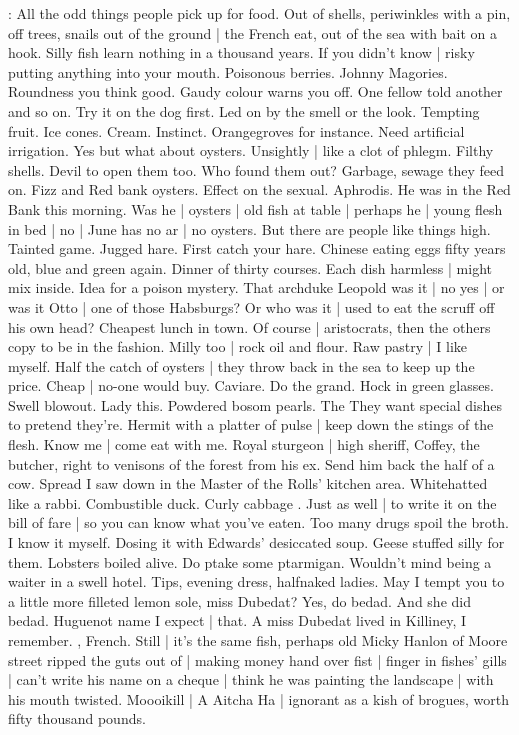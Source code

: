 \BloomInt:
All the odd things people pick up for food.
Out of shells,
periwinkles with a pin,
off trees,
snails out of the ground |
the French eat,
out of the sea with bait on a hook.
Silly fish learn nothing in a thousand years.
If you didn't know |
risky putting anything into your mouth.
Poisonous berries.
Johnny Magories.
Roundness you think good.
Gaudy colour warns you off.
One fellow told another and so on.
Try it on the dog first.
Led on by the smell or the look.
Tempting fruit.
Ice cones.
Cream.
Instinct.
Orangegroves for instance.
Need artificial irrigation.
Yes but what about oysters.
Unsightly |
like a clot of phlegm.
Filthy shells.
Devil to open them too.
Who found them out?
Garbage, sewage they feed on.
Fizz and Red bank oysters.
Effect on the sexual.
Aphrodis.
He was in the Red Bank this morning.
Was he |
oysters |
old fish at table |
perhaps he |
young flesh in bed |
no |
June has no ar |
no oysters.
But there are people like things high.
Tainted game.
Jugged hare.
First catch your hare.
Chinese eating eggs fifty years old,
blue and green again.
Dinner of thirty courses.
Each dish harmless |
might mix inside.
Idea for a poison mystery.
That archduke Leopold was it |
no yes |
or was it Otto |
one of those Habsburgs?
Or who was it |
used to eat the scruff off his own head?
Cheapest lunch in town.
Of course |
aristocrats,
then the others copy to be in the fashion.
Milly too |
rock oil and flour.
Raw pastry |
I like myself.
Half the catch of oysters |
they throw back in the sea to keep up the price.
Cheap |
no-one would buy.
Caviare.
Do the grand.
Hock in green glasses.
Swell blowout.
Lady this.
Powdered bosom pearls.
The 
They want special dishes to pretend they're.
Hermit with a platter of pulse |
keep down the stings of the flesh.
Know me |
come eat with me.
Royal sturgeon |
high sheriff,
Coffey, the butcher,
right to venisons of the forest from his ex.
Send him back the half of a cow.
Spread I saw down in the Master of the Rolls' kitchen area.
Whitehatted  like a rabbi.
Combustible duck.
Curly cabbage .
Just as well |
to write it on the bill of fare |
so you can know what you've eaten.
Too many drugs spoil the broth.
I know it myself.
Dosing it with Edwards' desiccated soup.
Geese stuffed silly for them.
Lobsters boiled alive.
Do ptake some ptarmigan.
Wouldn't mind being a waiter in a swell hotel.
Tips,
evening dress,
halfnaked ladies.
May I tempt you to a little more filleted lemon sole,
miss Dubedat?
Yes, do bedad.
And she did bedad.
Huguenot name I expect |
that.
A miss Dubedat lived in Killiney,
I remember.
, French.
Still |
it's the same fish,
perhaps old Micky Hanlon of Moore street ripped the guts out of |
making money hand over fist |
finger in fishes' gills |
can't write his name on a cheque |
think he was painting the landscape |
with his mouth twisted.
Moooikill |
A Aitcha Ha |
ignorant as a kish of brogues,
worth fifty thousand pounds.

